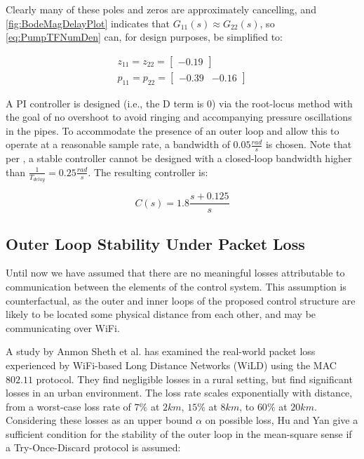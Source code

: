 Clearly many of these poles and zeros are approximately cancelling, and \cref{fig:BodeMagDelayPlot} indicates that $G_{11}(s) \approx G_{22}(s)$, so \cref{eq:PumpTFNumDen} can, for design purposes, be simplified to:

\begin{equation}\label{eq:PumpTFSimple}
	\begin{gathered}
		z_{11} = z_{22} = \begin{bmatrix}-0.19\end{bmatrix} \\
		p_{11} = p_{22} = \begin{bmatrix}-0.39 & -0.16 \end{bmatrix}
	\end{gathered}
\end{equation}

A PI controller is designed (i.e., the D term is $0$) via the root-locus method with the goal of no overshoot to avoid ringing and accompanying pressure oscillations in the pipes. To accommodate the presence of an outer loop and allow this to operate at a reasonable sample rate, a bandwidth of $0.05 \frac{\si{rad}}{\si{s}}$ is chosen. Note that per \cite{Skogestad2005}, a stable controller cannot be designed with a closed-loop bandwidth higher than $\frac{1}{T_{delay}} = 0.25 \frac{\si{rad}}{\si{s}}$. The resulting controller is:

\begin{equation}\label{eq:PIDTransferFunction}
	C(s) = 1.8\frac{s+0.125}{s}
\end{equation}

\subsection{Outer Loop Stability Under Packet Loss}\label{subsec:PacketLossStability}

Until now we have assumed that there are no meaningful losses attributable to communication between the elements of the control system. This assumption is counterfactual, as the outer and inner loops of the proposed control structure are likely to be located some physical distance from each other, and may be communicating over WiFi.

A study by Anmon Sheth et al. \cite{Sheth2007} has examined the real-world packet loss experienced by WiFi-based Long Distance Networks (WiLD) using the MAC $802.11$ protocol. They find negligible losses in a rural setting, but find significant losses in an urban environment. The loss rate scales exponentially with distance, from a worst-case loss rate of $7\%$ at $2\si{km}$, $15\%$ at $8\si{km}$, to $60\%$ at $20\si{km}$. Considering these losses as an upper bound $\alpha$ on possible loss, Hu and Yan \cite{Hu2007} give a sufficient condition for the stability of the outer loop in the mean-square sense if a Try-Once-Discard protocol is assumed:

